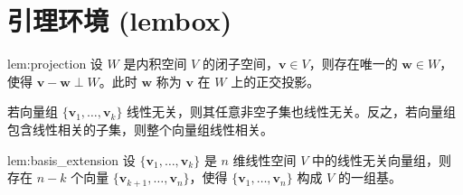 \section{引理环境 (lembox)}

\begin{lembox}[正交投影引理]{lem:projection}
设 \( W \) 是内积空间 \( V \) 的闭子空间，\( \mathbf{v} \in V \)，则存在唯一的 \( \mathbf{w} \in W \)，使得 \( \mathbf{v} - \mathbf{w} \perp W \)。此时 \( \mathbf{w} \) 称为 \( \mathbf{v} \) 在 \( W \) 上的正交投影。
\end{lembox}

\begin{lembox*}[线性无关引理]
若向量组 \( \{ \mathbf{v}_1, \dots, \mathbf{v}_k \} \) 线性无关，则其任意非空子集也线性无关。反之，若向量组包含线性相关的子集，则整个向量组线性相关。
\end{lembox*}

\begin{lembox}[基扩展引理]{lem:basis_extension}
设 \( \{ \mathbf{v}_1, \dots, \mathbf{v}_k \} \) 是 \( n \) 维线性空间 \( V \) 中的线性无关向量组，则存在 \( n - k \) 个向量 \( \{ \mathbf{v}_{k+1}, \dots, \mathbf{v}_n \} \)，使得 \( \{ \mathbf{v}_1, \dots, \mathbf{v}_n \} \) 构成 \( V \) 的一组基。
\end{lembox}